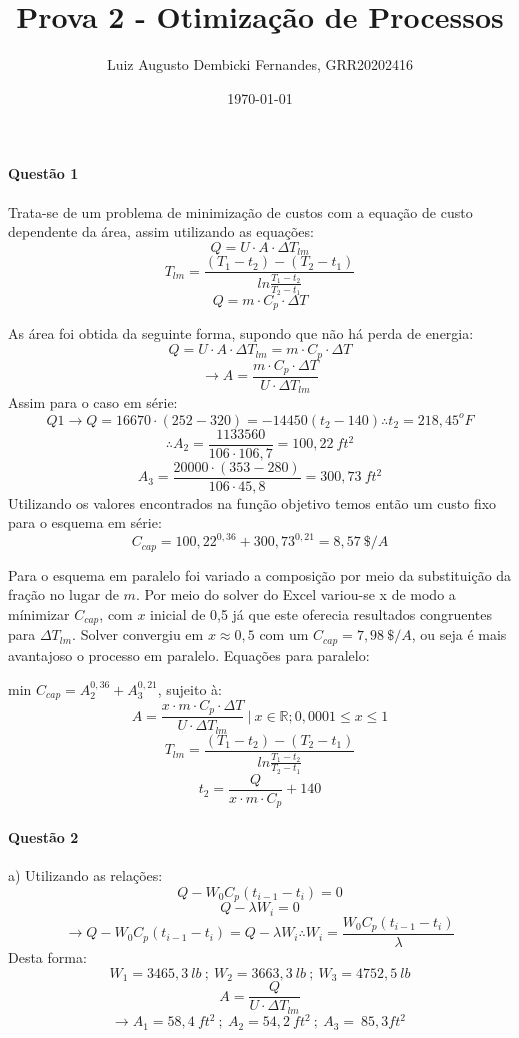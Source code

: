 \documentclass[]{article} %
\begin{document}
\title{Prova 2 - Otimização de Processos}
\author{Luiz Augusto Dembicki Fernandes, GRR20202416}
\date{\today}
\maketitle

\paragraph{Questão 1}

Trata-se de um problema de minimização de custos com a equação de custo dependente da
área, assim utilizando as equações:
\[ Q = U \cdot A \cdot \Delta T_{lm} \]
\[ T_{lm} = \frac{(T_1 - t_2) - (T_2 - t_1)}{ln  \frac{T_1 - t_2}{T_2 - t_1}}  \]
\[ Q = m \cdot C_p \cdot \Delta T \]

As área foi obtida da seguinte forma, supondo que não há perda de
energia:
\[ Q =  U \cdot A \cdot \Delta T_{lm} = m \cdot C_p \cdot \Delta T \]
\[ \to A = \frac{ m \cdot C_p \cdot \Delta T}{U \cdot \Delta T_{lm}} \]
Assim para o caso em série:
\[ Q1 \to Q = 16670 \cdot (252 - 320) = - 14450 (t_2 - 140) \therefore t_2 = 218,45 ^oF \]
\[ \therefore A_2 = \frac{ 1133560 }{ 106 \cdot 106,7} = 100,22 \ ft^2 \]
\[ A_3 = \frac{ 20000 \cdot (353 - 280)}{ 106 \cdot 45,8 } = 300,73 \ ft^2 \]
Utilizando os valores encontrados na função objetivo temos então um custo fixo para
o esquema em série:
\[ C_{cap} = 100,22^{0,36} + 300,73^{0,21} = 8,57 \ \$ \slash A \]

Para o esquema em paralelo foi variado a composição por meio da substituição da fração
no lugar de \(m\). Por meio do solver do Excel variou-se x de modo a mínimizar \(C_{cap}\),
com \(x\) inicial de 0,5 já que este oferecia resultados congruentes para \(\Delta T_{lm}\).
Solver convergiu em \(x \approx 0,5\) com um \(C_{cap} = 7,98 \ \$ \slash A \), ou seja
é mais avantajoso o processo em paralelo.
Equações para paralelo:
\begin{center}
    min \( C_{cap} = A_2 ^{0,36} + A_3 ^{0,21} \), sujeito à:
    \[ A = \frac{ x \cdot m \cdot C_p \cdot \Delta T}{U \cdot \Delta T_{lm}} \ \vert \ x \in \mathbb{R} ; 0,0001 \leqslant x \leqslant 1\]
    \[ T_{lm} = \frac{(T_1 - t_2) - (T_2 - t_1)}{ln  \frac{T_1 - t_2}{T_2 - t_1}} \]
    \[ t_2 = \frac{Q}{ x \cdot m \cdot C_p} + 140\]
\end{center}

\paragraph{Questão 2}
a) Utilizando as relações:
\[ Q - W_0 C_p (t_{i-1}-t_i) = 0\]
\[ Q - \lambda W_i = 0 \]
\[\to Q - W_0 C_p (t_{i-1}-t_i) = Q - \lambda W_i \therefore W_i = \frac{W_0 C_p (t_{i-1}-t_i)}{\lambda}\]
Desta forma:
\[ W_1 = 3465,3 \ lb \ ; \ W_2 = 3663,3 \ lb \ ; \ W_3 = 4752,5 \ lb \]
\[ A = \frac{ Q }{U \cdot \Delta T_{lm}} \]
\[ \to A_1 = 58,4 \ ft^2 \ ; \ A_2 = 54,2 \ ft^2 \ ; \ A_3 = \ 85,3 ft^2 \ \]
\end{document}
